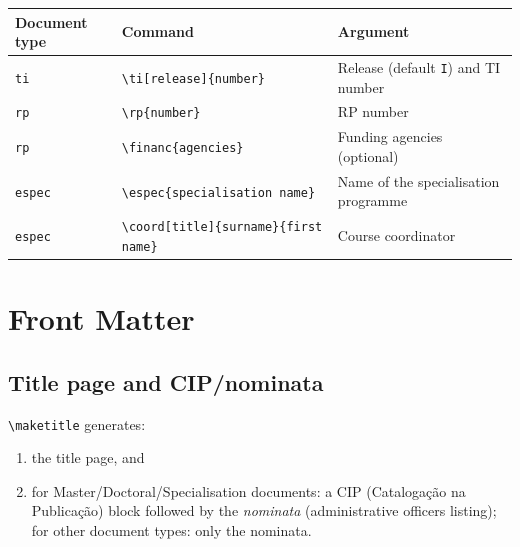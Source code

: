 \documentclass[11pt,a4paper]{article}
\newcommand{\opt}[1]{\texttt{#1}}
\newcommand{\cmd}[1]{\texttt{\textbackslash #1}}
\begin{document}
\begin{center}
\begin{tabular}{@{}lll@{}}
  \toprule
  Document type & Command & Argument \\
  \midrule
  \opt{ti}    & \cmd{ti}\texttt{[release]\{number\}}
              & Release (default \texttt{I}) and TI number \\
  \opt{rp}    & \cmd{rp}\texttt{\{number\}}
              & RP number \\
  \opt{rp}    & \cmd{financ}\texttt{\{agencies\}}
              & Funding agencies (optional) \\
  \opt{espec} & \cmd{espec}\texttt{\{specialisation name\}}
              & Name of the specialisation programme \\
  \opt{espec} & \cmd{coord}\texttt{[title]\{surname\}\{first name\}}
              & Course coordinator \\
  \bottomrule
\end{tabular}
\end{center}

\section{Front Matter}
\label{sec:frontmatter}

\subsection{Title page and CIP/nominata}

\begin{latex}
\begin{document}
\maketitle
\end{latex}

\cmd{maketitle} generates:
\begin{enumerate}
  \item the title page, and
  \item for Master/Doctoral/Specialisation documents: a CIP
        (Catalogação na Publicação) block followed by the
        \emph{nominata} (administrative officers listing);
        for other document types: only the nominata.
\end{enumerate}
\end{document}
